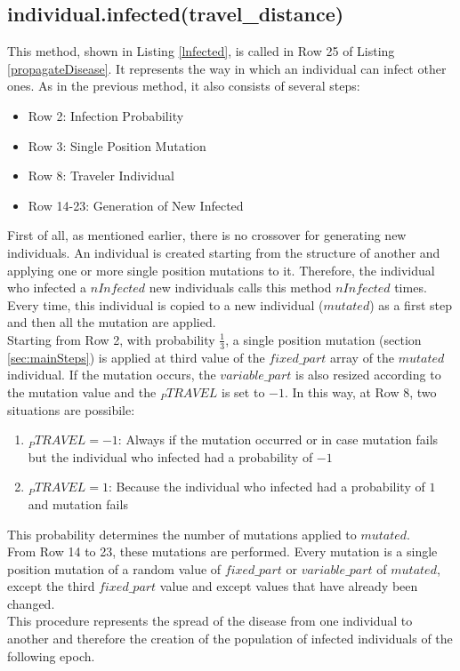 \documentclass[letterpaper]{article}%
\begin{document}
\subsection{individual.infected(travel\_distance)}
This method, shown in Listing \ref{lnfected}, is called in Row 25 of Listing \ref{propagateDisease}. It represents the way in which an individual can infect other ones. As in the previous method, it also consists of several steps:
\begin{itemize}
\item Row 2: Infection Probability
\item Row 3: Single Position Mutation
\item Row 8: Traveler Individual
\item Row 14-23: Generation of New Infected
\end{itemize}
First of all, as mentioned earlier, there is no crossover for generating new individuals. An individual is created starting from the structure of another and applying one or more single position mutations to it. Therefore, the individual who infected a $nInfected$ new individuals calls this method $nInfected$ times. Every time, this individual is copied to a new individual ($mutated$) as a first step and then all the mutation are applied.\\
Starting from Row 2, with probability $\frac{1}{3}$, a single position mutation (section \ref{sec:mainSteps}) is applied at third value of the $fixed\_part$ array of the $mutated$ individual. If the mutation occurs, the $variable\_part$ is also resized according to the mutation value and the $_PTRAVEL$ is set to $-1$.
In this way, at Row 8, two situations are possibile:
\begin{enumerate}
\item $_PTRAVEL = -1$: Always if the mutation occurred or in case mutation fails but the individual who infected had a probability of $-1$ 
\item $_PTRAVEL = 1$: Because the individual who infected had a probability of $1$ and mutation fails 
\end{enumerate}
This probability determines the number of mutations applied to $mutated$.\\
From Row 14 to 23, these mutations are performed. Every mutation is a single position mutation of a random value of $fixed\_part$ or $variable\_part$ of $mutated$, except the third $fixed\_part$ value and except values that have already been changed.\\
This procedure represents the spread of the disease from one individual to another and therefore the creation of the population of infected individuals of the following epoch.
\end{document}
